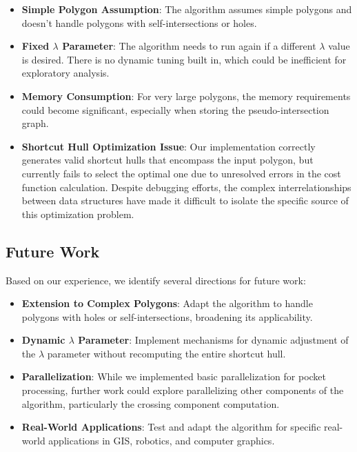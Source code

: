 \documentclass[11pt]{article}
\begin{document}
\begin{itemize}
    \item \textbf{Simple Polygon Assumption}: The algorithm assumes simple polygons and doesn't handle polygons with self-intersections or holes.
    
    \item \textbf{Fixed $\lambda$ Parameter}: The algorithm needs to run again if a different $\lambda$ value is desired. There is no dynamic tuning built in, which could be inefficient for exploratory analysis.
    
    \item \textbf{Memory Consumption}: For very large polygons, the memory requirements could become significant, especially when storing the pseudo-intersection graph.
    
\item \textbf{Shortcut Hull Optimization Issue}: Our implementation correctly generates valid shortcut hulls that encompass the input polygon, but currently fails to select the optimal one due to unresolved errors in the cost function calculation. Despite debugging efforts, the complex interrelationships between data structures have made it difficult to isolate the specific source of this optimization problem.
\end{itemize}

\subsection{Future Work}

Based on our experience, we identify several directions for future work:

\begin{itemize}
    \item \textbf{Extension to Complex Polygons}: Adapt the algorithm to handle polygons with holes or self-intersections, broadening its applicability.
    
    \item \textbf{Dynamic $\lambda$ Parameter}: Implement mechanisms for dynamic adjustment of the $\lambda$ parameter without recomputing the entire shortcut hull.
    
    \item \textbf{Parallelization}: While we implemented basic parallelization for pocket processing, further work could explore parallelizing other components of the algorithm, particularly the crossing component computation.
    
    \item \textbf{Real-World Applications}: Test and adapt the algorithm for specific real-world applications in GIS, robotics, and computer graphics.
\end{itemize}
\end{document}
